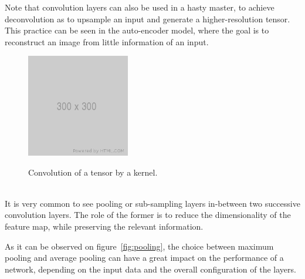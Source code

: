 Note that convolution layers can also be used in a hasty master, to achieve
deconvolution as to upsample an input and generate a higher-resolution tensor.
This practice can be seen in the auto-encoder model, where the goal is to
reconstruct an image from little information of an input.

\begin{figure}[h]
	\center
	\includegraphics[width=0.4\textwidth]{figure/300x300.png}
	\label{fig:convolution}
	\caption{Convolution of a tensor by a kernel.}
\end{figure}


~\\It is very common to see pooling or sub-sampling layers in-between two
successive convolution layers. The role of the former is to reduce the
dimensionality of the feature map, while preserving the relevant information.

As it can be observed on figure~\ref{fig:pooling}, the choice between maximum
pooling and average pooling can have a great impact on the performance of a
network, depending on the input data and the overall configuration of the
layers. 
\newpage

